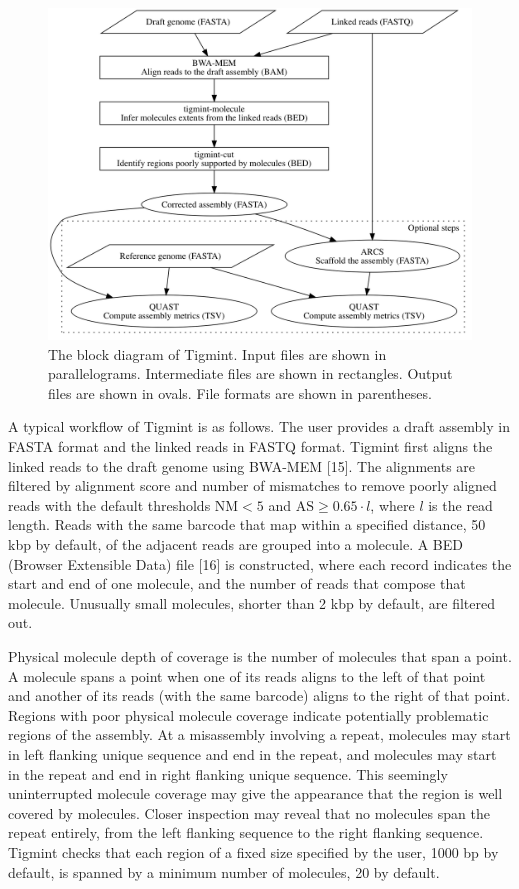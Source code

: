 \documentclass{bmcart}
\begin{document}
\begin{figure}[!htbp]
\hypertarget{fig:pipeline}{%
\centering
\includegraphics[width=4.8in]{figures/pipeline.png}
\caption{The block diagram of Tigmint. Input files are shown in parallelograms. Intermediate files are shown in rectangles. Output files are shown in ovals. File formats are shown in parentheses.}\label{fig:pipeline}
}
\end{figure}

A typical workflow of Tigmint is as follows. The user provides a draft assembly in FASTA format and the linked reads in FASTQ format. Tigmint first aligns the linked reads to the draft genome using BWA-MEM {[}15{]}. The alignments are filtered by alignment score and number of mismatches to remove poorly aligned reads with the default thresholds \(\textrm{NM} < 5\) and \(\textrm{AS} \geq 0.65 \cdot l\), where \(l\) is the read length. Reads with the same barcode that map within a specified distance, 50 kbp by default, of the adjacent reads are grouped into a molecule. A BED (Browser Extensible Data) file {[}16{]} is constructed, where each record indicates the start and end of one molecule, and the number of reads that compose that molecule. Unusually small molecules, shorter than 2 kbp by default, are filtered out.

Physical molecule depth of coverage is the number of molecules that span a point. A molecule spans a point when one of its reads aligns to the left of that point and another of its reads (with the same barcode) aligns to the right of that point. Regions with poor physical molecule coverage indicate potentially problematic regions of the assembly. At a misassembly involving a repeat, molecules may start in left flanking unique sequence and end in the repeat, and molecules may start in the repeat and end in right flanking unique sequence. This seemingly uninterrupted molecule coverage may give the appearance that the region is well covered by molecules. Closer inspection may reveal that no molecules span the repeat entirely, from the left flanking sequence to the right flanking sequence. Tigmint checks that each region of a fixed size specified by the user, 1000 bp by default, is spanned by a minimum number of molecules, 20 by default.
\end{document}
